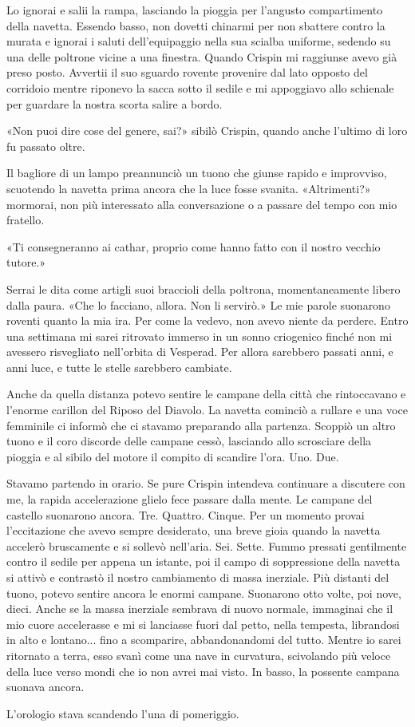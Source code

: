 Lo ignorai e salii la rampa, lasciando la pioggia per l'angusto
compartimento della navetta. Essendo basso, non dovetti chinarmi per non
sbattere contro la murata e ignorai i saluti dell'equipaggio nella sua
scialba uniforme, sedendo su una delle poltrone vicine a una finestra.
Quando Crispin mi raggiunse avevo già preso posto. Avvertii il suo
sguardo rovente provenire dal lato opposto del corridoio mentre riponevo
la sacca sotto il sedile e mi appoggiavo allo schienale per guardare la
nostra scorta salire a bordo.

«Non puoi dire cose del genere, sai?» sibilò Crispin, quando anche
l'ultimo di loro fu passato oltre.

Il bagliore di un lampo preannunciò un tuono che giunse rapido e
improvviso, scuotendo la navetta prima ancora che la luce fosse svanita.
«Altrimenti?» mormorai, non più interessato alla conversazione o a
passare del tempo con mio fratello.

«Ti consegneranno ai cathar, proprio come hanno fatto con il nostro
vecchio tutore.»

Serrai le dita come artigli suoi braccioli della poltrona,
momentaneamente libero dalla paura. «Che lo facciano, allora. Non li
servirò.» Le mie parole suonarono roventi quanto la mia ira. Per come la
vedevo, non avevo niente da perdere. Entro una settimana mi sarei
ritrovato immerso in un sonno criogenico finché non mi avessero
risvegliato nell'orbita di Vesperad. Per allora sarebbero passati anni,
e anni luce, e tutte le stelle sarebbero cambiate.

Anche da quella distanza potevo sentire le campane della città che
rintoccavano e l'enorme carillon del Riposo del Diavolo. La navetta
cominciò a rullare e una voce femminile ci informò che ci stavamo
preparando alla partenza. Scoppiò un altro tuono e il coro discorde
delle campane cessò, lasciando allo scrosciare della pioggia e al sibilo
del motore il compito di scandire l'ora. Uno. Due.

Stavamo partendo in orario. Se pure Crispin intendeva continuare a
discutere con me, la rapida accelerazione glielo fece passare dalla
mente. Le campane del castello suonarono ancora. Tre. Quattro. Cinque.
Per un momento provai l'eccitazione che avevo sempre desiderato, una
breve gioia quando la navetta accelerò bruscamente e si sollevò
nell'aria. Sei. Sette. Fummo pressati gentilmente contro il sedile per
appena un istante, poi il campo di soppressione della navetta si attivò
e contrastò il nostro cambiamento di massa inerziale. Più distanti del
tuono, potevo sentire ancora le enormi campane. Suonarono otto volte,
poi nove, dieci. Anche se la massa inerziale sembrava di nuovo normale,
immaginai che il mio cuore accelerasse e mi si lanciasse fuori dal
petto, nella tempesta, librandosi in alto e lontano... fino a
scomparire, abbandonandomi del tutto. Mentre io sarei ritornato a terra,
esso svanì come una nave in curvatura, scivolando più veloce della luce
verso mondi che io non avrei mai visto. In basso, la possente campana
suonava ancora.

L'orologio stava scandendo l'una di pomeriggio.
